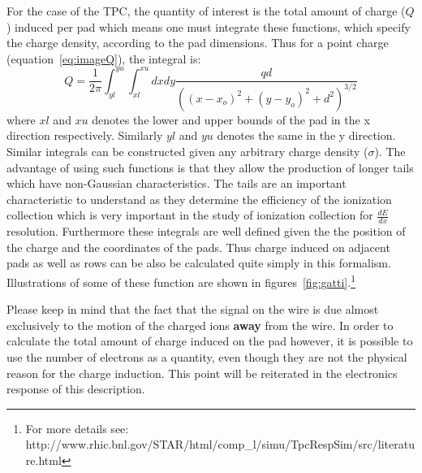 \documentclass[twoside]{article}
\begin{document}
For the case of the TPC, the quantity of interest is the total
amount of charge ($Q$) induced per pad which means one must integrate
these functions, which specify the charge density, according to the
pad dimensions.  Thus for a point charge (equation~\ref{eq:imageQ}),
the integral is:
\begin{equation}
  Q = \frac{1}{2 \pi} \int_{yl}^{yu} \int_{xl}^{xu} dx dy \frac{q d}{((x-x_{o})^{2} + (y-y_{o})^{2} + d^{2})^{3/2}}
  \label{eq:imageQint}
\end{equation}    
where $xl$ and $xu$ denotes the lower and upper bounds of
the pad in the x direction respectively.  Similarly $yl$ and $yu$
denotes the same in the y
direction.  Similar integrals can be constructed given any
arbitrary charge density ($\sigma$).  The advantage of using such functions
is that they allow the production of longer tails which have
non-Gaussian characteristics.  The tails are an important characteristic
to understand as they determine the efficiency of the ionization
collection which is very important in the
study of ionization collection for $\frac{dE}{dx}$ resolution.
Furthermore these integrals are well defined
given the the position of the charge and the coordinates
of the pads.  Thus charge induced on adjacent pads as well as rows
can be also be calculated quite simply in this formalism.
Illustrations of some of these
function are shown in figures~\ref{fig:gatti}.\footnote{For more
  details see: http://www.rhic.bnl.gov/STAR/html/comp\_l/simu/TpcRespSim/src/literature.html} 

Please keep in mind that the fact that the signal on the wire is
due almost exclusively to the motion of the charged ions {\bf away} from
the wire.  In order to calculate the total amount of charge induced
on the pad however, it is possible to use the number of electrons
as a quantity, even though they are not the physical reason for
the charge induction.  This point will be reiterated in the electronics
response of this description.
\end{document}
